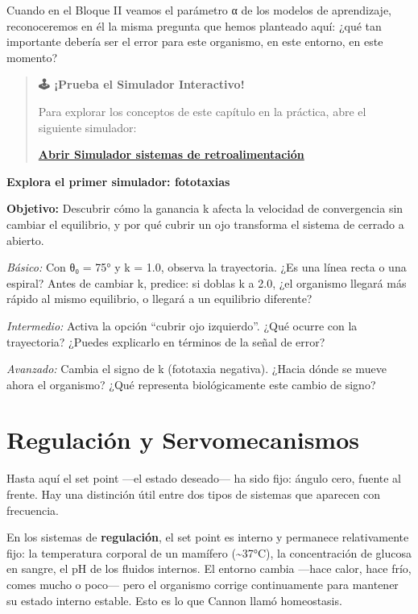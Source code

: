 \documentclass[
  letterpaper,
  DIV=11,
  numbers=noendperiod]{scrreprt}
\begin{document}
\begin{tcolorbox}[enhanced jigsaw, arc=.35mm, bottomrule=.15mm, breakable, colback=white, colframe=quarto-callout-note-color-frame, left=2mm, leftrule=.75mm, opacityback=0, rightrule=.15mm, toprule=.15mm]
Cuando en el Bloque II veamos el parámetro α de los modelos de
aprendizaje, reconoceremos en él la misma pregunta que hemos planteado
aquí: ¿qué tan importante debería ser el error para este organismo, en
este entorno, en este momento?

\begin{quote}
\textbf{🕹️ ¡Prueba el Simulador Interactivo!}

Para explorar los conceptos de este capítulo en la práctica, abre el
siguiente simulador:

\href{https://colab.research.google.com/github/arbouria/Libro-ACA-2026/blob/main/Simuladores/retroalimentacion.ipynb}{\textbf{Abrir
Simulador sistemas de retroalimentación}}
\end{quote}

\textbf{Explora el primer simulador: fototaxias}

\textbf{Objetivo:} Descubrir cómo la ganancia k afecta la velocidad de
convergencia sin cambiar el equilibrio, y por qué cubrir un ojo
transforma el sistema de cerrado a abierto.

\emph{Básico:} Con θ₀ = 75° y k = 1.0, observa la trayectoria. ¿Es una
línea recta o una espiral? Antes de cambiar k, predice: si doblas k a
2.0, ¿el organismo llegará más rápido al mismo equilibrio, o llegará a
un equilibrio diferente?

\emph{Intermedio:} Activa la opción ``cubrir ojo izquierdo''. ¿Qué
ocurre con la trayectoria? ¿Puedes explicarlo en términos de la señal de
error?

\emph{Avanzado:} Cambia el signo de k (fototaxia negativa). ¿Hacia dónde
se mueve ahora el organismo? ¿Qué representa biológicamente este cambio
de signo?

\section{Regulación y
Servomecanismos}\label{regulaciuxf3n-y-servomecanismos}

Hasta aquí el set point ---el estado deseado--- ha sido fijo: ángulo
cero, fuente al frente. Hay una distinción útil entre dos tipos de
sistemas que aparecen con frecuencia.

En los sistemas de \textbf{regulación}, el set point es interno y
permanece relativamente fijo: la temperatura corporal de un mamífero
(\textasciitilde37°C), la concentración de glucosa en sangre, el pH de
los fluidos internos. El entorno cambia ---hace calor, hace frío, comes
mucho o poco--- pero el organismo corrige continuamente para mantener su
estado interno estable. Esto es lo que Cannon llamó homeostasis.


\end{tcolorbox}
\end{document}
